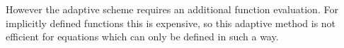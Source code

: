 However the adaptive scheme requires an additional function evaluation.
For implicitly defined functions this is expensive, so this adaptive method is not efficient for equations which can only be defined in such a way.







